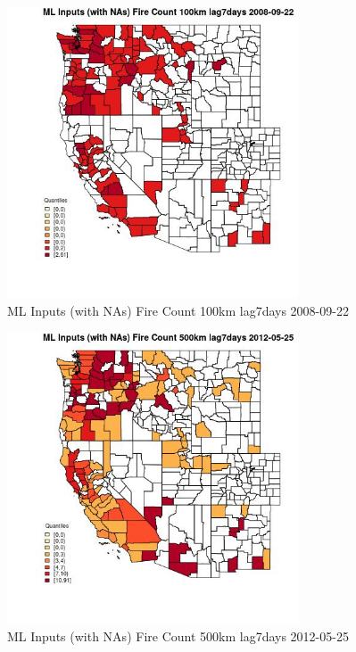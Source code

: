 \begin{figure} 
\centering  
\includegraphics[width=0.77\textwidth]{Code_Outputs/Report_ML_input_PM25_Step4_part_e_de_duplicated_aves_compiled_2019-05-18wNAs_CountyFire_Count_100km_lag7daysMean2008-09-22_2008-09-22.jpg} 
\caption{\label{fig:Report_ML_input_PM25_Step4_part_e_de_duplicated_aves_compiled_2019-05-18wNAsCountyFire_Count_100km_lag7daysMean2008-09-22_2008-09-22}ML Inputs (with NAs) Fire Count 100km lag7days 2008-09-22} 
\end{figure} 
 

\begin{figure} 
\centering  
\includegraphics[width=0.77\textwidth]{Code_Outputs/Report_ML_input_PM25_Step4_part_e_de_duplicated_aves_compiled_2019-05-18wNAs_CountyFire_Count_500km_lag7daysMean2012-05-25_2012-05-25.jpg} 
\caption{\label{fig:Report_ML_input_PM25_Step4_part_e_de_duplicated_aves_compiled_2019-05-18wNAsCountyFire_Count_500km_lag7daysMean2012-05-25_2012-05-25}ML Inputs (with NAs) Fire Count 500km lag7days 2012-05-25} 
\end{figure} 
 

